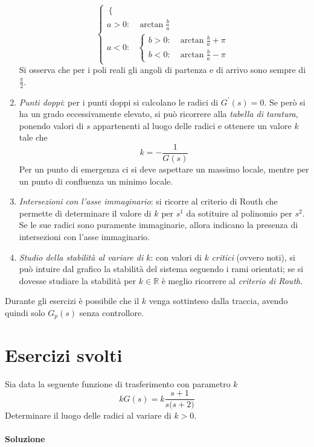 \begin{enumerate}
\[\begin{cases}
\begin{cases}
					\end{cases} \\
				a > 0 \colon & \arctan{\frac{b}{a}} \\
				a < 0 \colon &
					\begin{cases}
						b > 0\colon & \arctan{\frac{b}{a}} +\pi \\
						b < 0\colon & \arctan{\frac{b}{a}} -\pi
					\end{cases}
			\end{cases}
		\]
		Si osserva che per i poli reali gli angoli di partenza e di arrivo
		sono sempre di \(\frac{\pi}{2}\).
	\item \emph{Punti doppi}:
		per i punti doppi si calcolano le radici di \(G^\prime(s) = 0\).
		Se però si ha un grado eccessivamente elevato, si può ricorrere
		alla \emph{tabella di taratura}, ponendo valori di \(s\) appartenenti
		al luogo delle radici e ottenere un valore \(k\) tale che
		\[
			k = -\frac{1}{G(s)}
		\]
		Per un punto di emergenza ci si deve aspettare un massimo locale,
		mentre per un punto di confluenza un minimo locale.
	\item \emph{Intersezioni con l'asse immaginario}: si ricorre al criterio
		di Routh che permette di determinare il valore di \(k\) per
		\(s^1\) da sotituire al polinomio per \(s^2\). Se le sue
		radici sono puramente immaginarie, allora indicano la presenza di
		intersezioni con l'asse immaginario.
	\item \emph{Studio della stabilità al variare di \(k\)}: con valori
		di \(k\) \emph{critici} (ovvero noti), si può intuire
		dal grafico la stabilità del sistema seguendo i rami orientati;
		se si dovesse studiare la stabilità per \(k \in \mathbb{R}\) è
		meglio ricorrere al \emph{criterio di Routh}.
\end{enumerate}

\begin{nota}
Durante gli esercizi è possibile che il \(k\) venga sottinteso dalla traccia,
avendo quindi solo \(G_p(s)\) senza controllore.
\end{nota}

\section{Esercizi svolti}
\exercise{}
Sia data la seguente funzione di trasferimento con parametro \(k\)
\[
	kG(s) = k \frac{s+1}{s \bigl( s+2 \bigr)}
\]
Determinare il luogo delle radici al variare di \(k > 0\).

\paragraph{Soluzione}

